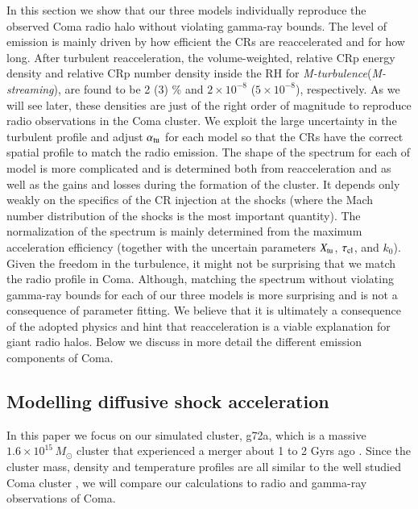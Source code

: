 \documentclass[fleqn,usenatbib,useAMS]{mnras}
\newcommand{\Mstream}{{\it M-streaming}\xspace}
\newcommand{\Mflatturb}{{\it M-turbulence}\xspace}
\begin{document}
In this section we show that our three models individually reproduce
the observed Coma radio halo without violating gamma-ray bounds. The
level of emission is mainly driven by how efficient the CRs are
reaccelerated and for how long. After turbulent reacceleration, the
volume-weighted, relative CRp energy density and relative CRp number
density inside the RH for \Mflatturb (\Mstream), are found to be 2 (3)
\% and $2\times10^{-8}$ ($5\times10^{-8}$), respectively. As we will
see later, these densities are just of the right order of magnitude to
reproduce radio observations in the Coma cluster. We exploit the large
uncertainty in the turbulent profile and adjust $\alpha_{\mathrm{tu}}$ for
each model so that the CRs have the correct spatial profile to match
the radio emission. The shape of the spectrum for each of model is
more complicated and is determined both from reacceleration and as
well as the gains and losses during the formation of the cluster. It
depends only weakly on the specifics of the CR injection at the shocks
(where the Mach number distribution of the shocks is the most
important quantity). The normalization of the spectrum is mainly
determined from the maximum acceleration efficiency (together with the
uncertain parameters $X_{\mathrm{tu}}$, $\tau_{\mathrm{cl}}$, and $k_0$). Given
the freedom in the turbulence, it might not be surprising that we match
the radio profile in Coma. Although, matching the spectrum without
violating gamma-ray bounds for each of our three models is more
surprising and is not a consequence of parameter fitting. We believe
that it is ultimately a consequence of the adopted physics and hint
that reacceleration is a viable explanation for giant radio
halos. Below we discuss in more detail the different emission
components of Coma.


\subsection{Modelling diffusive shock acceleration}
\label{sec:cosmo_sim}
In this paper we focus on our simulated cluster, g72a, which is a
massive $1.6\times10^{15}\,M_\odot$ cluster that experienced a merger
about 1 to 2 Gyrs ago \citep{2009MNRAS.399..497D}. Since the cluster
mass, density and temperature profiles are all similar to the well
studied Coma cluster \citep{2007MNRAS.378..385P,pinzke10}, we will
compare our calculations to radio and gamma-ray observations of Coma.
\end{document}
